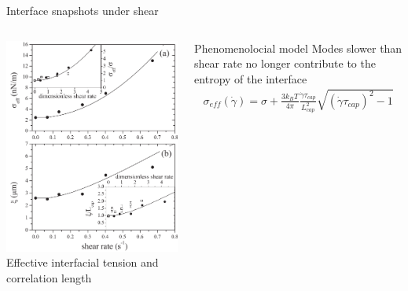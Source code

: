 \documentclass[9pt, dvipsnames,aspectratio=169]{beamer} %
\begin{document}
\begin{frame}
\begin{overprint}
\begin{columns}
    	\centering	    
	    Interface snapshots under shear 
	    \end{columns}
	    \begin{columns}
	    \centering	    
	    \includegraphics[width=0.75\linewidth]{derks-results.png} \\
		{\footnotesize  Effective interfacial tension and correlation length}
	    \begin{block}{Phenomenolocial model}
	    Modes slower than shear rate  no longer contribute to the entropy of the interface
			\begin{align}
			\sigma_{eff}(\dot{\gamma}) = \sigma + \frac{3 k_B T}{4 \pi} \frac{\dot{\gamma} \tau_{cap}}{L^2_{cap}} \sqrt{(\dot{\gamma}\tau_{cap})^2-1}
			\end{align}
		\end{block}
	    \end{columns}	
	\end{overprint}
\end{frame}
\end{document}

